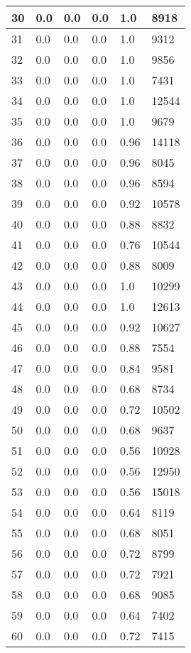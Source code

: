 \begin{longtable}{|l|l|l|l|l|l|}
30 & 0.0 & 0.0 & 0.0 & 1.0 & 8918 \\ \hline 
31 & 0.0 & 0.0 & 0.0 & 1.0 & 9312 \\ \hline 
32 & 0.0 & 0.0 & 0.0 & 1.0 & 9856 \\ \hline 
33 & 0.0 & 0.0 & 0.0 & 1.0 & 7431 \\ \hline 
34 & 0.0 & 0.0 & 0.0 & 1.0 & 12544 \\ \hline 
35 & 0.0 & 0.0 & 0.0 & 1.0 & 9679 \\ \hline 
36 & 0.0 & 0.0 & 0.0 & 0.96 & 14118 \\ \hline 
37 & 0.0 & 0.0 & 0.0 & 0.96 & 8045 \\ \hline 
38 & 0.0 & 0.0 & 0.0 & 0.96 & 8594 \\ \hline 
39 & 0.0 & 0.0 & 0.0 & 0.92 & 10578 \\ \hline 
40 & 0.0 & 0.0 & 0.0 & 0.88 & 8832 \\ \hline 
41 & 0.0 & 0.0 & 0.0 & 0.76 & 10544 \\ \hline 
42 & 0.0 & 0.0 & 0.0 & 0.88 & 8009 \\ \hline 
43 & 0.0 & 0.0 & 0.0 & 1.0 & 10299 \\ \hline 
44 & 0.0 & 0.0 & 0.0 & 1.0 & 12613 \\ \hline 
45 & 0.0 & 0.0 & 0.0 & 0.92 & 10627 \\ \hline 
46 & 0.0 & 0.0 & 0.0 & 0.88 & 7554 \\ \hline 
47 & 0.0 & 0.0 & 0.0 & 0.84 & 9581 \\ \hline 
48 & 0.0 & 0.0 & 0.0 & 0.68 & 8734 \\ \hline 
49 & 0.0 & 0.0 & 0.0 & 0.72 & 10502 \\ \hline 
50 & 0.0 & 0.0 & 0.0 & 0.68 & 9637 \\ \hline 
51 & 0.0 & 0.0 & 0.0 & 0.56 & 10928 \\ \hline 
52 & 0.0 & 0.0 & 0.0 & 0.56 & 12950 \\ \hline 
53 & 0.0 & 0.0 & 0.0 & 0.56 & 15018 \\ \hline 
54 & 0.0 & 0.0 & 0.0 & 0.64 & 8119 \\ \hline 
55 & 0.0 & 0.0 & 0.0 & 0.68 & 8051 \\ \hline 
56 & 0.0 & 0.0 & 0.0 & 0.72 & 8799 \\ \hline 
57 & 0.0 & 0.0 & 0.0 & 0.72 & 7921 \\ \hline 
58 & 0.0 & 0.0 & 0.0 & 0.68 & 9085 \\ \hline 
59 & 0.0 & 0.0 & 0.0 & 0.64 & 7402 \\ \hline 
60 & 0.0 & 0.0 & 0.0 & 0.72 & 7415 \\ \hline 

\end{longtable}
